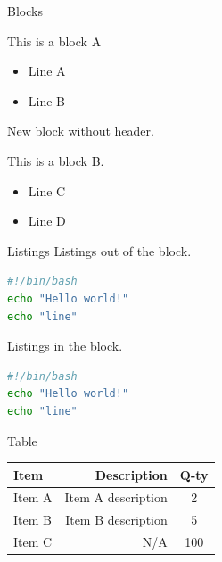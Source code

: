 \documentclass[
  11pt,
  ignorenonframetext,
  aspectratio=169,
  aspectratio=169]{beamer}
\providecommand{\tightlist}{%
  \setlength{\itemsep}{0pt}\setlength{\parskip}{0pt}}
\begin{document}
\begin{frame}{Blocks}
\protect\hypertarget{blocks}{}
\begin{block}{This is a block A}
\protect\hypertarget{this-is-a-block-a}{}
\begin{itemize}
\tightlist
\item
  Line A
\item
  Line B
\end{itemize}
\end{block}

\begin{block}{}
\protect\hypertarget{section}{}
New block without header.
\end{block}

\begin{block}{This is a block B.}
\protect\hypertarget{this-is-a-block-b.}{}
\begin{itemize}
\tightlist
\item
  Line C
\item
  Line D
\end{itemize}
\end{block}
\end{frame}

\begin{frame}[fragile]{Listings}
\protect\hypertarget{listings}{}
Listings out of the block.

\begin{lstlisting}[language=sh]
#!/bin/bash
echo "Hello world!"
echo "line"
\end{lstlisting}

\begin{block}{Listings in the block.}
\protect\hypertarget{listings-in-the-block.}{}
\begin{lstlisting}[language=sh]
#!/bin/bash
echo "Hello world!"
echo "line"
\end{lstlisting}
\end{block}
\end{frame}

\begin{frame}{Table}
\protect\hypertarget{table}{}
\begin{longtable}[]{@{}lrc@{}}
\toprule\noalign{}
\textbf{Item} & \textbf{Description} & \textbf{Q-ty} \\
\midrule\noalign{}
\endhead
\bottomrule\noalign{}
\endlastfoot
Item A & Item A description & 2 \\
Item B & Item B description & 5 \\
Item C & N/A & 100 \\
\end{longtable}
\end{frame}
\end{document}
